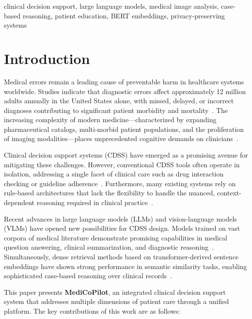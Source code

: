 \documentclass[conference]{IEEEtran}
\begin{document}
\begin{IEEEkeywords}
clinical decision support, large language models, medical image analysis, case-based reasoning, patient education, BERT embeddings, privacy-preserving systems
\end{IEEEkeywords}

\section{Introduction}
\label{sec:intro}

Medical errors remain a leading cause of preventable harm in healthcare systems worldwide. Studies indicate that diagnostic errors affect approximately 12 million adults annually in the United States alone, with missed, delayed, or incorrect diagnoses contributing to significant patient morbidity and mortality~\cite{b1}. The increasing complexity of modern medicine---characterized by expanding pharmaceutical catalogs, multi-morbid patient populations, and the proliferation of imaging modalities---places unprecedented cognitive demands on clinicians~\cite{b2}.

Clinical decision support systems (CDSS) have emerged as a promising avenue for mitigating these challenges. However, conventional CDSS tools often operate in isolation, addressing a single facet of clinical care such as drug interaction checking or guideline adherence~\cite{b3}. Furthermore, many existing systems rely on rule-based architectures that lack the flexibility to handle the nuanced, context-dependent reasoning required in clinical practice~\cite{b4}.

Recent advances in large language models (LLMs) and vision-language models (VLMs) have opened new possibilities for CDSS design. Models trained on vast corpora of medical literature demonstrate promising capabilities in medical question answering, clinical summarization, and diagnostic reasoning~\cite{b5}. Simultaneously, dense retrieval methods based on transformer-derived sentence embeddings have shown strong performance in semantic similarity tasks, enabling sophisticated case-based reasoning over clinical records~\cite{b6}.

This paper presents \textbf{MediCoPilot}, an integrated clinical decision support system that addresses multiple dimensions of patient care through a unified platform. The key contributions of this work are as follows:
\end{document}
